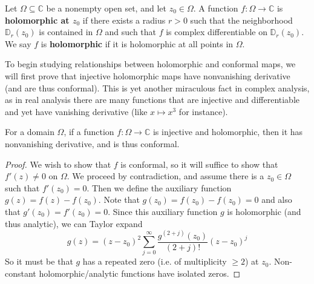 
\begin{definition} Let $\Omega\subseteq \mathbb{C}$ be a nonempty open set, and let $z_0\in\Omega$. A function $f:\Omega\to\mathbb{C}$ is \textbf{\textcolor{myblue}{holomorphic at $z_0$}} if there exists a radius $r>0$ such that the neighborhood $\mathbb{D}_r(z_0)$ is contained in $\Omega$ and such that $f$ is complex differentiable on $\mathbb{D}_r(z_0).$ We say $f$ is \textbf{\textcolor{myblue}{holomorphic}} if it is holomorphic at all points in $\Omega$. 
\end{definition}

\noindent To begin studying relationships between holomorphic and conformal maps, we will first prove that injective holomorphic maps have nonvanishing derivative (and are thus conformal). This is yet another miraculous fact in complex analysis, as in real analysis there are many functions that are injective and differentiable and yet have vanishing derivative (like $x\mapsto x^3$ for instance).

\begin{theorem}
    For a domain $\Omega$, if a function $f:\Omega\to\mathbb{C}$ is injective and holomorphic, then it has nonvanishing derivative, and is thus conformal. \begin{proof}  We wish to show that $f$ is conformal, so it will suffice to show that $f'(z)\neq 0$ on $\Omega$. We proceed by contradiction, and assume there is a $z_0\in\Omega$ such that $f'(z_0)=0$. Then we define the auxiliary function $g(z)=f(z)-f(z_0)$. Note that $g(z_0)=f(z_0)-f(z_0)=0$ and also that $g'(z_0)=f'(z_0)=0$. Since this auxiliary function $g$ is holomorphic (and thus analytic), we can Taylor expand \begin{equation}g(z)=(z-z_0)^2\sum_{j=0}^\infty\dfrac{g^{(2+j)}(z_0)}{(2+j)!}(z-z_0)^j\end{equation}So it must be that $g$ has a repeated zero (i.e. of multiplicity $\geq 2$) at $z_0$. Non-constant holomorphic/analytic functions have isolated zeros.  
    \end{proof}
\end{theorem}



